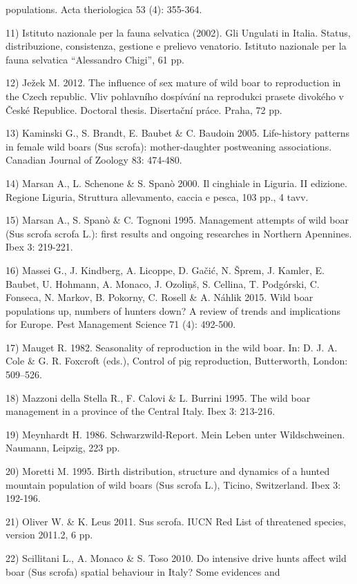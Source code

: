 \documentclass[12pt]{book} %
\begin{document}
\begin{mdframed}[linewidth=1pt]
{populations. Acta theriologica 53 (4): 355-364.\par 11) Istituto nazionale per la fauna selvatica (2002). Gli Ungulati
in Italia. Status, distribuzione, consistenza, gestione e prelievo venatorio. Istituto nazionale per la fauna selvatica
“Alessandro Chigi”, 61 pp.\par 12) Ježek M. 2012. The influence of sex mature of wild boar to reproduction in the Czech
republic. Vliv pohlavního dospívání na reprodukci prasete divokého v České Republice. Doctoral thesis. Disertační
práce. Praha, 72 pp.\par 13) Kaminski G., S. Brandt, E. Baubet \& C. Baudoin 2005. Life-history patterns in female wild
boars (Sus scrofa): mother-daughter postweaning associations. Canadian Journal of Zoology 83: 474-480.\par 14) Marsan
A., L. Schenone \& S. Spanò 2000. Il cinghiale in Liguria. II edizione. Regione Liguria, Struttura allevamento, caccia
e pesca, 103 pp., 4 tavv.\par 15) Marsan A., S. Spanò \& C. Tognoni 1995. Management attempts of wild boar (Sus scrofa
scrofa L.): first results and ongoing researches in Northern Apennines. Ibex 3: 219-221.\par 16) Massei G., J.
Kindberg, A. Licoppe, D. Gačić, N. Šprem, J. Kamler, E. Baubet, U. Hohmann, A. Monaco, J. Ozoliņš, S. Cellina, T.
Podgórski, C. Fonseca, N. Markov, B. Pokorny, C. Rosell \& A. Náhlik 2015. Wild boar populations up, numbers of hunters
down? A review of trends and implications for Europe. Pest Management Science 71 (4): 492-500.\par 17) Mauget R. 1982.
Seasonality of reproduction in the wild boar. In: D. J. A. Cole \& G. R. Foxcroft (eds.), Control of pig reproduction,
Butterworth, London: 509–526.\par 18) Mazzoni della Stella R., F. Calovi \& L. Burrini 1995. The wild boar management
in a province of the Central Italy. Ibex 3: 213-216.\par 19) Meynhardt H. 1986. Schwarzwild-Report. Mein Leben unter
Wildschweinen. Naumann, Leipzig, 223 pp.\par 20) Moretti M. 1995. Birth distribution, structure and dynamics of a
hunted mountain population of wild boars (Sus scrofa L.), Ticino, Switzerland. Ibex 3: 192-196.\par 21) Oliver W. \& K.
Leus 2011. Sus scrofa. IUCN Red List of threatened species, version 2011.2, 6 pp.\par 22) Scillitani L., A. Monaco \&
S. Toso 2010. Do intensive drive hunts affect wild boar (Sus scrofa) spatial behaviour in Italy? Some evidences and
}
\end{mdframed}
\end{document}
